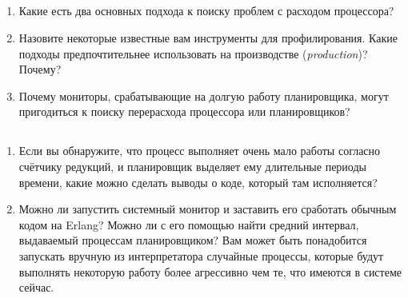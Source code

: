 \subsection*{\ReviewTitle{}}

\begin{enumerate}
	\item Какие есть два основных подхода к поиску проблем с расходом процессора?
	\item Назовите некоторые известные вам инструменты для профилирования. Какие подходы предпочтительнее использовать на производстве (\emph{production})? Почему?
	\item Почему мониторы, срабатывающие на долгую работу планировщика, могут пригодиться к поиску перерасхода процессора или планировщиков?
\end{enumerate}

\subsection*{\OpenEndedTitle{}}

\begin{enumerate}
	\item Если вы обнаружите, что процесс выполняет очень мало работы согласно счётчику редукций, и планировщик выделяет ему длительные периоды времени, какие можно сделать выводы о коде, который там исполняется?
	\item Можно ли запустить системный монитор и заставить его сработать обычным кодом на Erlang? Можно ли с его помощью найти средний интервал, выдаваемый процессам планировщиком? Вам может быть понадобится запускать вручную из интерпретатора случайные процессы, которые будут выполнять некоторую работу более агрессивно чем те, что имеются в системе сейчас.
\end{enumerate}


